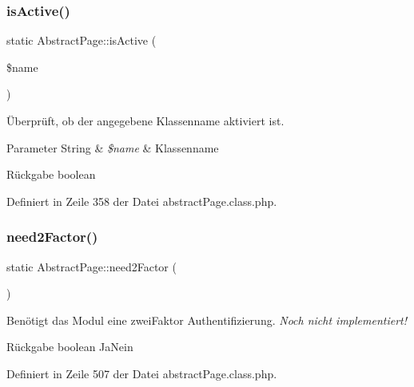 \mbox{\label{class_abstract_page_a260351465f02ea24dda76922932a30bb}} 
\subsubsection{\texorpdfstring{is\+Active()}{isActive()}}
{\footnotesize\ttfamily static Abstract\+Page\+::is\+Active (\begin{DoxyParamCaption}\item[{}]{\$name }\end{DoxyParamCaption})\hspace{0.3cm}{\ttfamily [static]}}

Überprüft, ob der angegebene Klassenname aktiviert ist. 
\begin{DoxyParams}[1]{Parameter}
String & {\em \$name} & Klassenname \\
\hline
\end{DoxyParams}
\begin{DoxyReturn}{Rückgabe}
boolean 
\end{DoxyReturn}


Definiert in Zeile 358 der Datei abstract\+Page.\+class.\+php.

\mbox{\label{class_abstract_page_af3ba7e0104142ca2c241cce7f88cc116}} 
\subsubsection{\texorpdfstring{need2\+Factor()}{need2Factor()}}
{\footnotesize\ttfamily static Abstract\+Page\+::need2\+Factor (\begin{DoxyParamCaption}{ }\end{DoxyParamCaption})\hspace{0.3cm}{\ttfamily [static]}}

Benötigt das Modul eine zwei\+Faktor Authentifizierung. {\itshape Noch nicht implementiert!} \begin{DoxyReturn}{Rückgabe}
boolean Ja\+Nein 
\end{DoxyReturn}


Definiert in Zeile 507 der Datei abstract\+Page.\+class.\+php.

\mbox{\label{class_abstract_page_a38d6dadfe0b63ef71938b9ac2b74bc90}} 
